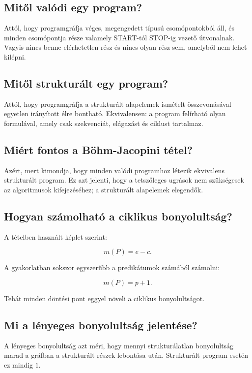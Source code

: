 \subsection{Mitől valódi egy program?}

Attól, hogy programgráfja véges, megengedett típusú csomópontokból áll, és minden csomópontja része valamely START-tól STOP-ig vezető útvonalnak. Vagyis nincs benne elérhetetlen rész és nincs olyan rész sem, amelyből nem lehet kilépni.

\subsection{Mitől strukturált egy program?}

Attól, hogy programgráfja a strukturált alapelemek ismételt összevonásával egyetlen irányított élre bontható. Ekvivalensen: a program felírható olyan formulával, amely csak szekvenciát, elágazást és ciklust tartalmaz.

\subsection{Miért fontos a Böhm-Jacopini tétel?}

Azért, mert kimondja, hogy minden valódi programhoz létezik ekvivalens strukturált program. Ez azt jelenti, hogy a tetszőleges ugrások nem szükségesek az algoritmusok kifejezéséhez; a strukturált alapelemek elegendők.

\subsection{Hogyan számolható a ciklikus bonyolultság?}

A tételben használt képlet szerint:

\[
m(P)=e-c.
\]

A gyakorlatban sokszor egyszerűbb a predikátumok számából számolni:

\[
m(P)=p+1.
\]

Tehát minden döntési pont eggyel növeli a ciklikus bonyolultságot.

\subsection{Mi a lényeges bonyolultság jelentése?}

A lényeges bonyolultság azt méri, hogy mennyi strukturálatlan bonyolultság marad a gráfban a strukturált részek lebontása után. Strukturált program esetén ez mindig $1$.


